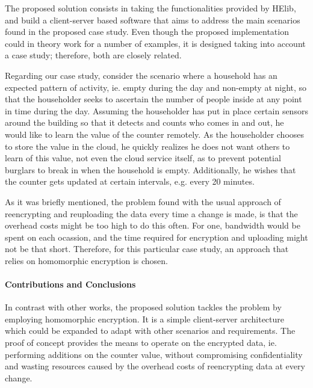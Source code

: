 The proposed solution consists in taking the functionalities provided by HElib, and build a client-server based software that aims to address the main scenarios found in the proposed case study. Even though the proposed implementation could in theory work for a number of examples, it is designed taking into account a case study; therefore, both are closely related.

Regarding our case study, consider the scenario where a household has an expected pattern of activity, ie. empty during the day and non-empty at night, so that the householder seeks to ascertain the number of people inside at any point in time during the day. Assuming the householder has put in place certain sensors around the building so that it detects and counts who comes in and out, he would like to learn the value of the counter remotely. As the householder chooses to store the value in the cloud, he quickly realizes he does not want others to learn of this value, not even the cloud service itself, as to prevent potential burglars to break in when the household is empty. Additionally, he wishes that the counter gets updated at certain intervals, e.g. every 20 minutes. 

As it was briefly mentioned, the problem found with the usual approach of reencrypting and reuploading the data every time a change is made, is that the overhead costs might be too high to do this often. For one, bandwidth would be spent on each ocassion, and the time required for encryption and uploading might not be that short. Therefore, for this particular case study, an approach that relies on homomorphic encryption is chosen.

\paragraph{Contributions and Conclusions}
In contrast with other works, the proposed solution tackles the problem by employing homomorphic encryption. It is a simple client-server architecture which could be expanded to adapt with other scenarios and requirements. The proof of concept provides the means to operate on the encrypted data, ie. performing additions on the counter value, without compromising confidentiality and wasting resources caused by the overhead costs of reencrypting data at every change.



